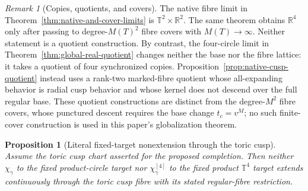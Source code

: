 \documentclass[11pt]{article}
\numberwithin{equation}{section}
\newtheorem{proposition}[theorem]{Proposition}
\theoremstyle{definition}
\theoremstyle{remark}
\newtheorem{remark}[theorem]{Remark}
\newcommand{\R}{\mathbb R}
\newcommand{\T}{\mathbb T}
\begin{document}
\begin{remark}[Copies, quotients, and covers]
The native fibre limit in Theorem~\ref{thm:native-and-cover-limits} is
$\T^2\times\R^2$.  The same theorem obtains $\R^4$ only after passing to
degree-$M(T)^2$ fibre covers with $M(T)\to\infty$.  Neither statement is a
quotient construction.  By contrast, the four-circle limit in
Theorem~\ref{thm:global-real-quotient} changes
neither the base nor the fibre lattice: it takes a quotient of four
synchronized copies.  Proposition~\ref{prop:native-cusp-quotient} instead
uses a rank-two marked-fibre quotient whose all-expanding behavior is radial
cusp behavior and whose kernel does not descend over the full regular base.
These quotient constructions are distinct from the degree-$M^2$ fibre covers,
whose punctured descent requires the base change $t_c=v^M$; no such
finite-cover construction is used in this paper's globalization theorem.
\end{remark}

\begin{proposition}[Literal fixed-target nonextension through the toric cusp]
\label{prop:circle-cusp-nonextension}
Assume the toric cusp chart asserted for the proposed completion.  Then
neither $\chi_\gamma$ to the fixed product-circle target nor
$\chi_\gamma^{[4]}$ to the fixed product $\mathbb T^4$ target extends
continuously through the toric cusp fibre with its stated regular-fibre
restriction.
\end{proposition}
\end{document}
